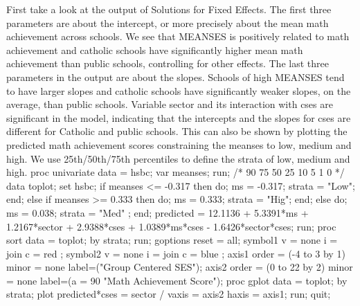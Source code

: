 First take a look at the output of Solutions for Fixed Effects. The first three parameters are about the intercept, or more precisely about the mean math achievement across schools. We see that MEANSES is positively related to math achievement and catholic schools have significantly higher mean math achievement than public schools, controlling for other effects.
The last three parameters in the output are about the slopes. Schools of high MEANSES tend to have larger slopes and catholic schools have significantly weaker slopes, on the average, than public schools.
Variable sector and its interaction with cses are significant in the model, indicating that the intercepts and the slopes for cses are different for Catholic and public schools. This can also be shown by plotting the predicted math achievement scores constraining the meanses to low, medium and high. We use 25th/50th/75th percentiles to define the strata of low, medium and high.
proc univariate data = hsbc;
  var meanses;
run;
/*
90%
75%
50%
25%
10%
5%
1%
0%
*/
data toplot;
  set hsbc;
  if meanses <= -0.317 then do;
		ms = -0.317;
 		strata = "Low";   end;
  else if meanses >= 0.333 then do;
		ms = 0.333;
		strata = "Hig";   end;
  else do; ms = 0.038; strata = "Med" ; end;
  predicted = 12.1136 + 5.3391*ms + 1.2167*sector + 2.9388*cses +
              1.0389*ms*cses - 1.6426*sector*cses;
run;
proc sort data = toplot;
   by strata;
run;
goptions reset = all;
symbol1 v = none i = join c = red ;
symbol2 v = none i = join c = blue  ;
axis1 order = (-4 to 3 by 1) minor = none label=("Group Centered SES");
axis2 order = (0 to 22 by 2) minor = none label=(a = 90 "Math Achievement Score");
proc gplot data = toplot;
   by strata;
   plot predicted*cses = sector / vaxis = axis2 haxis = axis1; 
run;
quit; 


